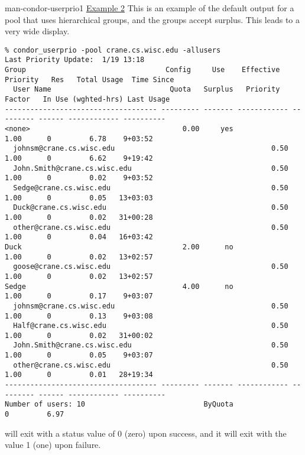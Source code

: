 \begin{ManPage}{}{man-condor-userprio}{1}
\underline{Example 2} This is an example of the default output for a pool
that uses hierarchical groups, and the groups accept surplus.
This leads to a very wide display.
\scriptsize
\begin{verbatim}
% condor_userprio -pool crane.cs.wisc.edu -allusers
Last Priority Update:  1/19 13:18
Group                                 Config     Use    Effective   Priority   Res   Total Usage  Time Since
  User Name                            Quota   Surplus   Priority    Factor   In Use (wghted-hrs) Last Usage
------------------------------------ --------- ------- ------------ --------- ------ ------------ ----------
<none>                                    0.00     yes                   1.00      0         6.78    9+03:52
  johnsm@crane.cs.wisc.edu                                     0.50      1.00      0         6.62    9+19:42
  John.Smith@crane.cs.wisc.edu                                 0.50      1.00      0         0.02    9+03:52
  Sedge@crane.cs.wisc.edu                                      0.50      1.00      0         0.05   13+03:03
  Duck@crane.cs.wisc.edu                                       0.50      1.00      0         0.02   31+00:28
  other@crane.cs.wisc.edu                                      0.50      1.00      0         0.04   16+03:42
Duck                                      2.00      no                   1.00      0         0.02   13+02:57
  goose@crane.cs.wisc.edu                                      0.50      1.00      0         0.02   13+02:57
Sedge                                     4.00      no                   1.00      0         0.17    9+03:07
  johnsm@crane.cs.wisc.edu                                     0.50      1.00      0         0.13    9+03:08
  Half@crane.cs.wisc.edu                                       0.50      1.00      0         0.02   31+00:02
  John.Smith@crane.cs.wisc.edu                                 0.50      1.00      0         0.05    9+03:07
  other@crane.cs.wisc.edu                                      0.50      1.00      0         0.01   28+19:34
------------------------------------ --------- ------- ------------ --------- ------ ------------ ----------
Number of users: 10                            ByQuota                             0         6.97 
\end{verbatim}
\normalsize

\ExitStatus

 will exit with a status value of 0 (zero) upon success,
and it will exit with the value 1 (one) upon failure.

\end{ManPage}
